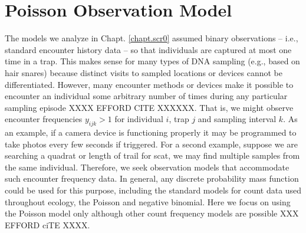 \section{Poisson Observation Model}

The models we analyze in Chapt. \ref{chapt.scr0} assumed binary
observations -- i.e., standard encounter history data -- so
that individuals are captured at most one time in a trap.  This makes
sense for many types of DNA sampling (e.g., based on hair snares)
because distinct visits to sampled locations or devices cannot be
differentiated. However, many encounter methods or devices make it
possible to encounter an individual some arbitrary number of times
during any particular sampling episode XXXX EFFORD CITE XXXXXX. 
That is, we might observe
encounter frequencies $y_{ijk}>1$
for individual $i$, trap $j$ and
sampling interval $k$.  As an example, if a camera device is
functioning properly it may be programmed to take photos every few
seconds if triggered.  For a second example, suppose we are searching
a quadrat or length of trail for scat, we may find multiple samples from the same
individual.
Therefore, we seek observation models that accommodate such encounter
frequency data.  In general, any discrete probability mass function
could be used for this purpose, including the standard models for
count data used throughout ecology, the Poisson and negative
binomial.  Here we focus on using the Poisson
model only although other count frequency models are possible XXX
EFFORD ciTE XXXX.

